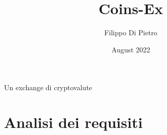 \documentclass{article}
\title{Coins-Ex}
\author{Filippo Di Pietro}
\date{August 2022}
\begin{document}
\maketitle
\begin{center}
Un exchange di cryptovalute
\end{center}
\newpage
\section{Analisi dei requisiti}
\end{document}
